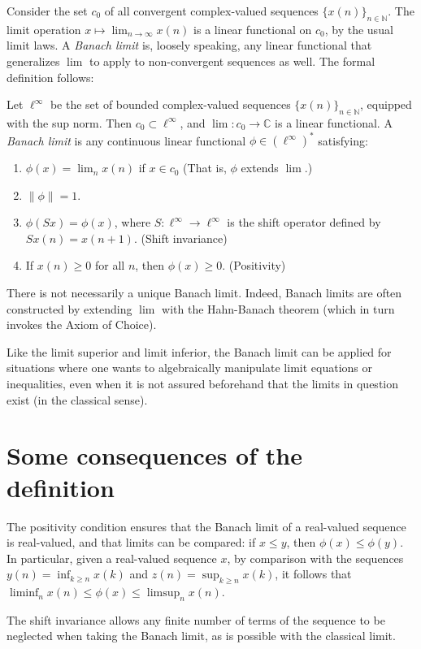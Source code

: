\documentclass[12pt]{article}
\newcommand{\nat}{\mathbb{N}}
\newcommand{\complex}{\mathbb{C}}
\providecommand{\defnterm}[1]{\emph{#1}}
\newcommand{\elli}{\ell^\infty}
\providecommand{\norm}[1]{\lVert#1\rVert}
\begin{document}
Consider the set $c_0$ of all convergent complex-valued sequences $\{ x(n) \}_{n \in \nat}$.
The limit operation $x \mapsto \lim_{n \to \infty} x(n)$
is a linear functional on $c_0$, by the usual limit laws.
A \defnterm{Banach limit} is, loosely speaking, any linear functional that generalizes $\lim$ to apply to non-convergent sequences as well. The formal definition follows:

Let $\elli$ be the set of bounded complex-valued sequences $\{ x(n) \}_{n \in \nat}$, equipped
with the sup norm.
Then $c_0 \subset \elli$, and $\lim\colon c_0 \to \complex$ is a linear functional.
A \defnterm{Banach limit} is any continuous linear functional $\phi \in (\elli)^*$ satisfying:
\begin{enumerate}[i]
\item
$\phi(x) = \lim_n x(n)$ if $x \in c_0$ (That is, $\phi$ extends $\lim$.)
\item
$\norm{\phi} = 1$.
\item
$\phi (Sx) = \phi(x)$, where $S\colon \elli \to \elli$ is the shift operator defined by $Sx(n) = x(n+1)$. (Shift invariance)
\item
If $x(n) \geq 0$ for all $n$, then $\phi(x) \geq 0$. (Positivity)
\end{enumerate}

There is not necessarily a unique Banach limit. Indeed, Banach limits are often constructed
by extending $\lim$ with the Hahn-Banach theorem (which in turn invokes the Axiom of Choice).

Like the limit superior and limit inferior, the Banach limit can be applied for situations
where one wants to algebraically manipulate limit equations or inequalities, 
even when it is not assured beforehand
that the limits in question exist (in the classical sense).

\section{Some consequences of the definition}
The positivity condition ensures that the Banach limit of a real-valued sequence is real-valued,
and that limits can be compared: 
if $x \leq y$, then $\phi(x) \leq \phi(y)$.
In particular, given a real-valued sequence $x$, by comparison with the sequences
$y(n) = \inf_{k \geq n} x(k)$ and $z(n) = \sup_{k \geq n} x(k)$,
it follows that $\liminf_n x(n) \leq \phi(x) \leq \limsup_n x(n)$.

The shift invariance allows any finite number of terms of the sequence to be neglected when taking the Banach limit, as is possible with the classical limit.
\end{document}
